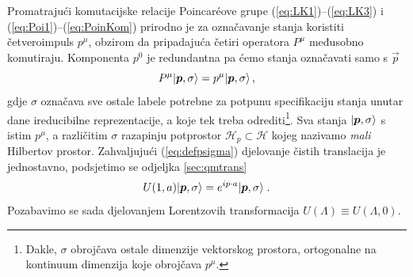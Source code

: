 Promatrajući komutacijske relacije Poincar\'{e}ove grupe 
(\ref{eq:LK1})--(\ref{eq:LK3}) i (\ref{eq:Poi1})--(\ref{eq:PoinKom})
prirodno je za označavanje stanja koristiti četveroimpuls $p^{\mu}$,
obzirom da pripadajuća četiri operatora $P^{\mu}$ međusobno komutiraju.
Komponenta $p^0$ je redundantna pa ćemo stanja označavati samo s $\vec{p}$
\begin{equation}
    P^{\mu} \ket{\vec{p}, \sigma} = p^{\mu} \ket{\vec{p}, \sigma} \,,
    \label{eq:defpsigma}
\end{equation}
gdje $\sigma$ označava sve ostale labele potrebne za potpunu specifikaciju
stanja unutar dane ireducibilne reprezentacije, a koje tek treba odrediti\footnote{Dakle,
    $\sigma$ obrojčava ostale dimenzije
vektorskog prostora, ortogonalne na kontinuum dimenzija koje obrojčava $p^{\mu}$.}.
Sva stanja $\ket{\vec{p}, \sigma}$ s istim $p^{\mu}$, a različitim $\sigma$
razapinju potprostor $\mathcal{H}_{p} \subset \mathcal{H}$ kojeg nazivamo
\emph{mali} Hilbertov prostor. Zahvaljujući (\ref{eq:defpsigma}) djelovanje
čistih translacija je jednostavno, podsjetimo se odjeljka \ref{sec:qmtrans} 
\begin{equation}
    U(1, a) \ket{\vec{p}, \sigma} = e^{i p\cdot a}  \ket{\vec{p}, \sigma}\;.
    \label{eq:PoiTrans}
\end{equation}
Pozabavimo se sada djelovanjem Lorentzovih transformacija $U(\Lambda)\equiv U(\Lambda, 0)$.


